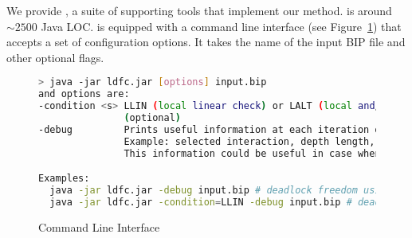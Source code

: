 %
We provide \deadlocktool{}, a suite of supporting tools that implement our method. \deadlocktool{} is around $\sim 2500$ Java LOC.
%
\deadlocktool{} is equipped with a command line interface (see Figure~\ref{code:cmd-ldfc}) that accepts a set 
of configuration options. 
It takes the name of the input BIP file and other optional flags. 

\begin{figure}
\begin{lstlisting}[language=Bash]
> java -jar ldfc.jar [options] input.bip 
and options are:
-condition <s> LLIN (local linear check) or LALT (local and/or check - default)
               (optional)
-debug         Prints useful information at each iteration of checking. 
               Example: selected interaction, depth length, etc.
               This information could be useful in case when the condition fails.

Examples:
  java -jar ldfc.jar -debug input.bip # deadlock freedom using default LALT
  java -jar ldfc.jar -condition=LLIN -debug input.bip # deadlock freedom using LLIN
\end{lstlisting}
\caption{\deadlocktool{} Command Line Interface}
\label{code:cmd-ldfc}
\end{figure}
